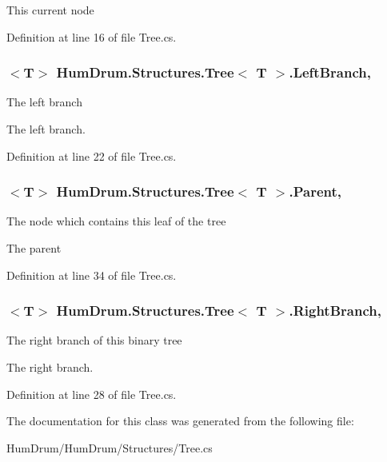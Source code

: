 This current node 



Definition at line 16 of file Tree.\+cs.

\subsubsection[{\texorpdfstring{Left\+Branch}{LeftBranch}}]{$<$T$>$ {\bf Hum\+Drum.\+Structures.\+Tree}$<$ T $>$.Left\+Branch\hspace{0.3cm}{\ttfamily [get]}, {\ttfamily [set]}}\hypertarget{classHumDrum_1_1Structures_1_1Tree_a713658d58f7222e2b3de4878f74abcf2}{}\label{classHumDrum_1_1Structures_1_1Tree_a713658d58f7222e2b3de4878f74abcf2}


The left branch 

The left branch.

Definition at line 22 of file Tree.\+cs.

\subsubsection[{\texorpdfstring{Parent}{Parent}}]{$<$T$>$ {\bf Hum\+Drum.\+Structures.\+Tree}$<$ T $>$.Parent\hspace{0.3cm}{\ttfamily [get]}, {\ttfamily [set]}}\hypertarget{classHumDrum_1_1Structures_1_1Tree_ab9c1b5646424bc2926a944a64bd952c2}{}\label{classHumDrum_1_1Structures_1_1Tree_ab9c1b5646424bc2926a944a64bd952c2}


The node which contains this leaf of the tree 

The parent

Definition at line 34 of file Tree.\+cs.

\subsubsection[{\texorpdfstring{Right\+Branch}{RightBranch}}]{$<$T$>$ {\bf Hum\+Drum.\+Structures.\+Tree}$<$ T $>$.Right\+Branch\hspace{0.3cm}{\ttfamily [get]}, {\ttfamily [set]}}\hypertarget{classHumDrum_1_1Structures_1_1Tree_a2b0d1d71d45216c34d14479b04a6c7a8}{}\label{classHumDrum_1_1Structures_1_1Tree_a2b0d1d71d45216c34d14479b04a6c7a8}


The right branch of this binary tree 

The right branch.

Definition at line 28 of file Tree.\+cs.



The documentation for this class was generated from the following file\+:\begin{DoxyCompactItemize}
\item 
Hum\+Drum/\+Hum\+Drum/\+Structures/Tree.\+cs\end{DoxyCompactItemize}
